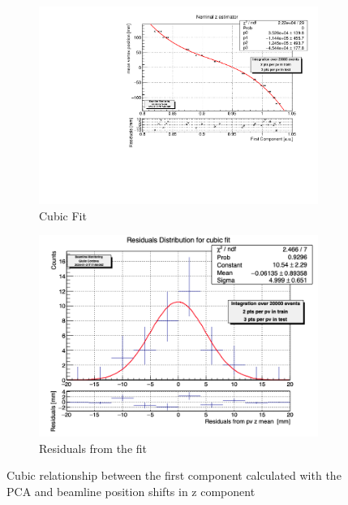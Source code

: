 \begin{figure}
    \centering
    \begin{subfigure}{0.48\textwidth}
    \includegraphics[width=\linewidth]{figures/z_cubic_fit.pdf}
    \caption{Cubic Fit}\label{fig:zfit_cubic_MC}
    \end{subfigure}
    \begin{subfigure}{0.48\textwidth}
    \includegraphics[width=\linewidth]{figures/z_cubic_res.png}
    \caption{Residuals from the fit}\label{fig:zres_cubic_MC}
    \end{subfigure}
    \caption{Cubic relationship between the first component calculated with the PCA and beamline position shifts in z component}
    \label{fig:y_MC}
\end{figure}



